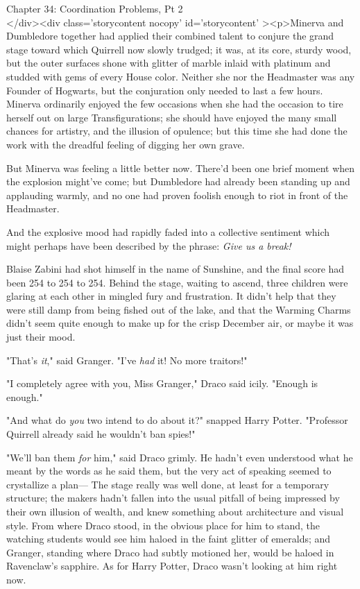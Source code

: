 
Chapter 34: Coordination Problems, Pt 2\\
</div><div  class='storycontent nocopy' id='storycontent' ><p>Minerva and 
Dumbledore together had applied their combined talent to conjure the grand 
stage toward which Quirrell now slowly trudged; it was, at its core, sturdy 
wood, but the outer surfaces shone with glitter of marble inlaid with platinum 
and studded with gems of every House color. Neither she nor the Headmaster was 
any Founder of Hogwarts, but the conjuration only needed to last a few hours. 
Minerva ordinarily enjoyed the few occasions when she had the occasion to tire 
herself out on large Transfigurations; she should have enjoyed the many small 
chances for artistry, and the illusion of opulence; but this time she had done 
the work with the dreadful feeling of digging her own grave.

But Minerva was feeling a little better now. There'd been one brief moment when 
the explosion might've come; but Dumbledore had already been standing up and 
applauding warmly, and no one had proven foolish enough to riot in front of the 
Headmaster.

And the explosive mood had rapidly faded into a collective sentiment which 
might perhaps have been described by the phrase: \emph{Give us a break!}

Blaise Zabini had shot himself in the name of Sunshine, and the final score had 
been 254 to 254 to 254.
\sbreak
Behind the stage, waiting to ascend, three children were glaring at each other 
in mingled fury and frustration. It didn't help that they were still damp from 
being fished out of the lake, and that the Warming Charms didn't seem quite 
enough to make up for the crisp December air, or maybe it was just their mood.

"That's \emph{it}," said Granger. "I've \emph{had} it! No more traitors!"

"I completely agree with you, Miss Granger," Draco said icily. "Enough is 
enough."

"And what do \emph{you} two intend to do about it?" snapped Harry Potter. 
"Professor Quirrell already said he wouldn't ban spies!"

"We'll ban them \emph{for} him," said Draco grimly. He hadn't even understood 
what he meant by the words as he said them, but the very act of speaking seemed 
to crystallize a plan---
\sbreak
The stage really was well done, at least for a temporary structure; the makers 
hadn't fallen into the usual pitfall of being impressed by their own illusion 
of wealth, and knew something about architecture and visual style. From where 
Draco stood, in the obvious place for him to stand, the watching students would 
see him haloed in the faint glitter of emeralds; and Granger, standing where 
Draco had subtly motioned her, would be haloed in Ravenclaw's sapphire. As for 
Harry Potter, Draco wasn't looking at him right now.

